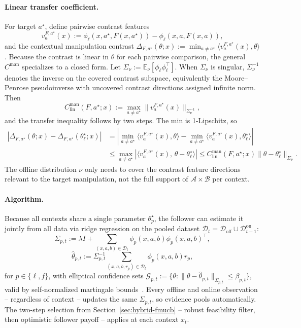 \documentclass{article}
\newcommand{\cA}{\mathcal{A}}
\newcommand{\cB}{\mathcal{B}}
\newcommand{\cG}{\mathcal{G}}
\newcommand{\cD}{\mathcal{D}}
\newcommand{\E}{\mathbb{E}}           %
\begin{document}
\paragraph{Linear transfer coefficient.}
For target $a^\star$, define pairwise contrast features
\[
    v_a^{F,a^\star}(x):=\phi_\ell(x,a^\star,F(x,a^\star))-\phi_\ell(x,a,F(x,a)),
\]
and the contextual manipulation contrast $\Delta_{F,a^\star}(\theta;x):=\min_{a\neq a^\star}\langle v_a^{F,a^\star}(x),\theta\rangle$. Because the contrast is linear in $\theta$ for each pairwise comparison, the general $C^{\mathrm{man}}$ specializes to a closed form. Let $\Sigma_\nu:=\E_\nu[\phi_\ell\phi_\ell^\top]$. When $\Sigma_\nu$ is singular, $\Sigma_\nu^{-1}$ denotes the inverse on the covered contrast subspace, equivalently the Moore--Penrose pseudoinverse with uncovered contrast directions assigned infinite norm. Then
\begin{equation}
    C_{\mathrm{lin}}^{\mathrm{man}}(F,a^\star;x):=\max_{a\neq a^\star}\|v_a^{F,a^\star}(x)\|_{\Sigma_\nu^{-1}},
    \label{eq:linear-cman}
\end{equation}
and the transfer inequality follows by two steps. The min is 1-Lipschitz, so
\begin{align*}
|\Delta_{F,a^\star}(\theta;x) -\Delta_{F,a^\star}(\theta_\ell^\star;x)| &= \left|\min_{a\neq a^\star}\langle v_a^{F,a^\star}(x), \theta\rangle - \min_{a\neq a^\star}\langle v_a^{F,a^\star}(x), \theta_\ell^\star\rangle\right| \\
&\le \max_{a\neq a^\star} |\langle v_a^{F,a^\star}(x),\, \theta-\theta_\ell^\star\rangle| \le C_{\mathrm{lin}}^{\mathrm{man}}(F,a^\star;x) \|\theta-\theta_\ell^\star\|_{\Sigma_\nu}.
\end{align*} 
The offline distribution $\nu$ only needs to cover the contrast feature directions relevant to the target manipulation, not the full support of $\cA\times\cB$ per context.

\paragraph{Algorithm.}
Because all contexts share a single parameter $\theta_p^\star$, the follower can estimate it jointly from all data via ridge regression on the pooled dataset $\cD_t=\cD_{\mathrm{off}}\cup\cD_{t-1}^{\mathrm{on}}$:
\[
    \Sigma_{p,t}:=\lambda I+\sum_{(x,a,b)\in\cD_t}\phi_p(x,a,b)\phi_p(x,a,b)^\top,
\]
\[
    \hat\theta_{p,t}:=\Sigma_{p,t}^{-1}\sum_{(x,a,b,r_p)\in\cD_t}\phi_p(x,a,b)r_p,
\]
for $p\in\{\ell,f\}$, with elliptical confidence sets $\cG_{p,t}:=\{\theta:\|\theta-\hat\theta_{p,t}\|_{\Sigma_{p,t}}\le\beta_{p,t}\}$, valid by self-normalized martingale bounds~\cite{abbasi2011improved}. Every offline and online observation -- regardless of context -- updates the same $\Sigma_{p,t}$, so evidence pools automatically. The two-step selection from Section~\ref{sec:hybrid-fmucb} -- robust feasibility filter, then optimistic follower payoff -- applies at each context $x_t$.
\end{document}

